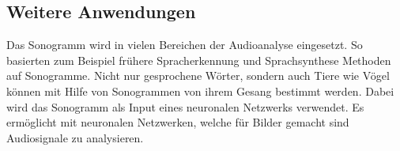 \subsection{Weitere Anwendungen}
Das Sonogramm wird in vielen Bereichen der Audioanalyse eingesetzt.
So basierten zum Beispiel frühere Spracherkennung und Sprachsynthese Methoden 
auf Sonogramme.
Nicht nur gesprochene Wörter, sondern auch Tiere wie Vögel können mit Hilfe
von Sonogrammen von ihrem Gesang bestimmt werden.
Dabei wird das Sonogramm als Input eines neuronalen Netzwerks verwendet.
Es ermöglicht mit neuronalen Netzwerken, welche für Bilder gemacht sind
Audiosignale zu analysieren.